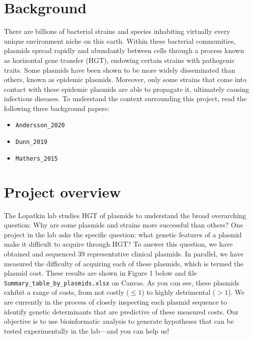 \documentclass{article}
\begin{document}
\section*{Background} There are billions of bacterial strains and species inhabiting virtually every unique environment niche on this earth. Within these bacterial communities, plasmids spread rapidly and abundantly between cells through a process known as horizontal gene transfer (HGT), endowing certain strains with pathogenic traits. Some plasmids have been shown to be more widely disseminated than others, known as epidemic plasmids. Moreover, only some strains that come into contact with these epidemic plasmids are able to propagate it, ultimately causing infectious diseases. To understand the context surrounding this project, read the following three background papers:
\begin{itemize}
    \item \texttt{Andersson\_2020}
    \item \texttt{Dunn\_2019}
    \item \texttt{Mathers\_2015}
\end{itemize}

\section*{Project overview}
The Lopatkin lab studies HGT of plasmids to understand the broad overarching question:  Why are some plasmids and strains more successful than others? One project in the lab asks the specific question: what genetic features of a plasmid make it difficult to acquire through HGT? To answer this question, we have obtained and sequenced 39 representative clinical plasmids. In parallel, we have measured the difficulty of acquiring each of these plasmids, which is termed the plasmid cost. These results are shown in Figure 1 below and file \texttt{Summary\_table\_by\_plasmids.xlsx} on Canvas. As you can see, these plasmids exhibit a range of costs, from not costly ($\leq 1$) to highly detrimental ($>1$). We are currently in the process of closely inspecting each plasmid sequence to identify genetic determinants that are predictive of these measured costs. Our objective is to use bioinformatic analysis to generate hypotheses that can be tested experimentally in the lab---and you can help us! 
\end{document}
